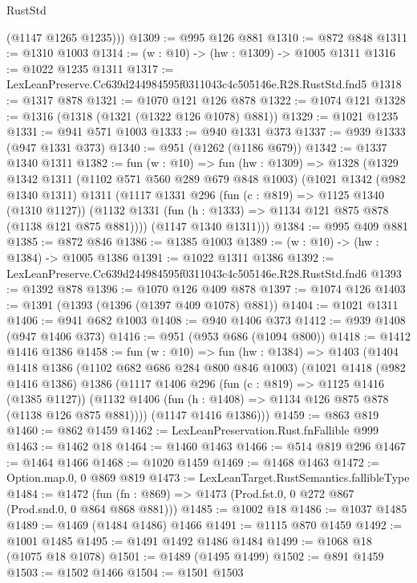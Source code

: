 \begin{lexlean}{RustStd}
\begin{coremodule}
        (@1147 @1265 @1235)))
@1309 := @995 @126 @881
@1310 := @872 @848
@1311 := @1310 @1003
@1314 := (w : @10) -> (hw : @1309) -> @1005 @1311
@1316 := @1022 @1235 @1311
@1317 := LexLeanPreserve.Cc639d244984595f0311043c4c505146e.R28.RustStd.fnd5
@1318 := @1317 @878
@1321 := @1070 @121 @126 @878
@1322 := @1074 @121
@1328 := @1316 (@1318 (@1321 (@1322 @126 @1078) @881))
@1329 := @1021 @1235
@1331 := @941 @571 @1003
@1333 := @940 @1331 @373
@1337 := @939 @1333 (@947 @1331 @373)
@1340 := @951 (@1262 (@1186 @679))
@1342 := @1337 @1340 @1311
@1382 := fun (w : @10) =>
  fun (hw : @1309) =>
  @1328
    (@1329
      @1342
      @1311
      (@1102 @571 @560 @289 @679 @848 @1003)
      (@1021
        @1342
        (@982 @1340 @1311)
        @1311
        (@1117
          @1331
          @296
          (fun (c : @819) => @1125 @1340 (@1310 @1127))
          (@1132 @1331 (fun (h : @1333) => @1134 @121 @875 @878 (@1138 @121 @875 @881))))
        (@1147 @1340 @1311)))
@1384 := @995 @409 @881
@1385 := @872 @846
@1386 := @1385 @1003
@1389 := (w : @10) -> (hw : @1384) -> @1005 @1386
@1391 := @1022 @1311 @1386
@1392 := LexLeanPreserve.Cc639d244984595f0311043c4c505146e.R28.RustStd.fnd6
@1393 := @1392 @878
@1396 := @1070 @126 @409 @878
@1397 := @1074 @126
@1403 := @1391 (@1393 (@1396 (@1397 @409 @1078) @881))
@1404 := @1021 @1311
@1406 := @941 @682 @1003
@1408 := @940 @1406 @373
@1412 := @939 @1408 (@947 @1406 @373)
@1416 := @951 (@953 @686 (@1094 @800))
@1418 := @1412 @1416 @1386
@1458 := fun (w : @10) =>
  fun (hw : @1384) =>
  @1403
    (@1404
      @1418
      @1386
      (@1102 @682 @686 @284 @800 @846 @1003)
      (@1021
        @1418
        (@982 @1416 @1386)
        @1386
        (@1117
          @1406
          @296
          (fun (c : @819) => @1125 @1416 (@1385 @1127))
          (@1132 @1406 (fun (h : @1408) => @1134 @126 @875 @878 (@1138 @126 @875 @881))))
        (@1147 @1416 @1386)))
@1459 := @863 @819
@1460 := @862 @1459
@1462 := LexLeanPreservation.Rust.fnFallible @999
@1463 := @1462 @18
@1464 := @1460 @1463
@1466 := @514 @819 @296
@1467 := @1464 @1466
@1468 := @1020 @1459
@1469 := @1468 @1463
@1472 := Option.map.{0, 0} @869 @819
@1473 := LexLeanTarget.RustSemantics.fallibleType
@1484 := @1472
    (fun (fn : @869) => @1473 (Prod.fst.{0, 0} @272 @867 (Prod.snd.{0, 0} @864 @868 @881)))
@1485 := @1002 @18
@1486 := @1037 @1485
@1489 := @1469 (@1484 @1486) @1466
@1491 := @1115 @870 @1459
@1492 := @1001 @1485
@1495 := @1491 @1492 @1486 @1484
@1499 := @1068 @18 (@1075 @18 @1078)
@1501 := @1489 (@1495 @1499)
@1502 := @891 @1459
@1503 := @1502 @1466
@1504 := @1501 @1503

\end{coremodule}
\end{lexlean}
